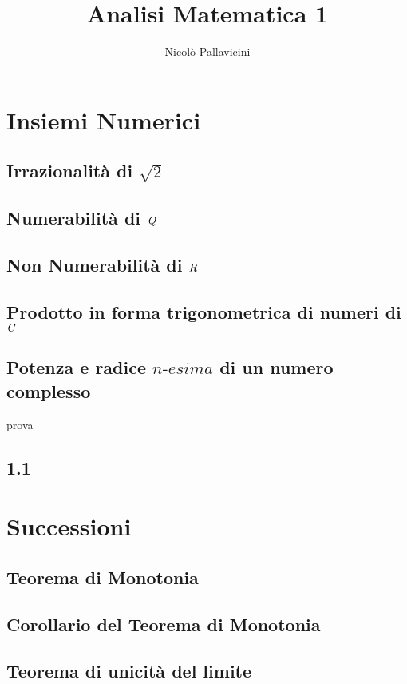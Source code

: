 \documentclass[11pt, a4paper]{book}
\author{Nicolò Pallavicini}
\title{Analisi Matematica 1}
\begin{document}
\maketitle

\chapter{Insiemi Numerici}
\section{Irrazionalità di $\sqrt{2}$}
\section{Numerabilità di $\emph{Q}$}
\section{Non Numerabilità di $\emph{R}$}
\section{Prodotto in forma trigonometrica di numeri di $\emph{C}$}
\section{Potenza e radice $\textit{n-esima}$ di un numero complesso}
prova
\newpage
\begin{flushleft}
\section*{1.1}

\end{flushleft}




\chapter{Successioni}
\section{Teorema di Monotonia}
\section{Corollario del Teorema di Monotonia}
\section{Teorema di unicità del limite}
\end{document}
